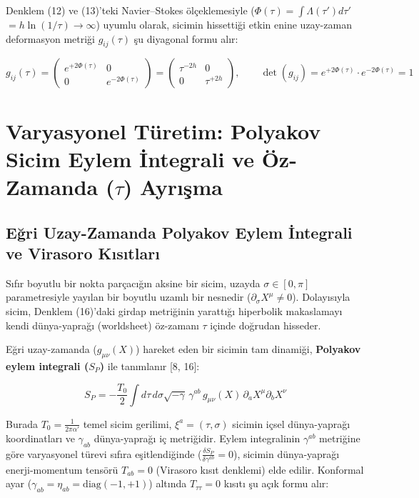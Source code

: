 \documentclass[12pt,a4paper]{article}
\begin{document}
{\sloppy
Denklem (12) ve (13)'teki Navier--Stokes ölçeklemesiyle ($\Phi(\tau) = \int \Lambda(\tau') d\tau'$ $= h \ln(1/\tau) \to \infty$) uyumlu olarak, sicimin hissettiği etkin enine uzay-zaman deformasyon metriği $g_{ij}(\tau)$ şu diyagonal formu alır:
\par}

\begin{equation}
g_{ij}(\tau) = \begin{pmatrix} e^{+2\Phi(\tau)} & 0 \\ 0 & e^{-2\Phi(\tau)} \end{pmatrix} = \begin{pmatrix} \tau^{-2h} & 0 \\ 0 & \tau^{+2h} \end{pmatrix}, \qquad \det(g_{ij}) = e^{+2\Phi(\tau)} \cdot e^{-2\Phi(\tau)} = 1
\end{equation}

\section{Varyasyonel Türetim: Polyakov Sicim Eylem İntegrali ve Öz-Zamanda ($\tau$) Ayrışma}

\subsection{Eğri Uzay-Zamanda Polyakov Eylem İntegrali ve Virasoro Kısıtları}

Sıfır boyutlu bir nokta parçacığın aksine bir sicim, uzayda $\sigma \in [0, \pi]$ parametresiyle yayılan bir boyutlu uzamlı bir nesnedir ($\partial_\sigma X^\mu \neq 0$). Dolayısıyla sicim, Denklem (16)'daki girdap metriğinin yarattığı hiperbolik makaslamayı kendi dünya-yaprağı (worldsheet) öz-zamanı $\tau$ içinde doğrudan hisseder.

Eğri uzay-zamanda ($g_{\mu\nu}(X)$) hareket eden bir sicimin tam dinamiği, \textbf{Polyakov eylem integrali ($S_P$)} ile tanımlanır [8, 16]:

\begin{equation}
S_P = -\frac{T_0}{2} \int d\tau \, d\sigma \sqrt{-\gamma} \, \gamma^{ab} \, g_{\mu\nu}(X) \, \partial_a X^\mu \partial_b X^\nu
\end{equation}

Burada $T_0 = \frac{1}{2\pi\alpha'}$ temel sicim gerilimi, $\xi^a = (\tau, \sigma)$ sicimin içsel dünya-yaprağı koordinatları ve $\gamma_{ab}$ dünya-yaprağı iç metriğidir. Eylem integralinin $\gamma^{ab}$ metriğine göre varyasyonel türevi sıfıra eşitlendiğinde ($\frac{\delta S_P}{\delta \gamma^{ab}} = 0$), sicimin dünya-yaprağı enerji-momentum tensörü $T_{ab} = 0$ (Virasoro kısıt denklemi) elde edilir. Konformal ayar ($\gamma_{ab} = \eta_{ab} = \text{diag}(-1, +1)$) altında $T_{\tau\tau} = 0$ kısıtı şu açık formu alır:
\end{document}
